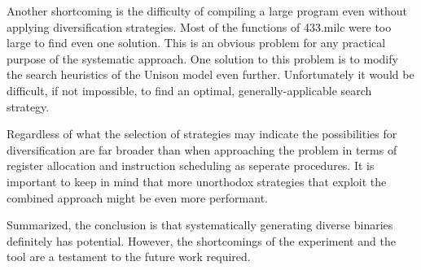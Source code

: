 Another shortcoming is the difficulty of compiling a large program even without applying
diversification strategies. Most of the functions of 433.milc were too large to find even
one solution. This is an obvious problem for any practical purpose of the systematic
approach. One solution to this problem is to modify the search heuristics of the Unison
model even further. Unfortunately it would be difficult, if not impossible, to find an
optimal, generally-applicable search strategy.

Regardless of what the selection of strategies may indicate the possibilities for
diversification are far broader than when approaching the problem in terms of register
allocation and instruction scheduling as seperate procedures. It is important to keep in
mind that more unorthodox strategies that exploit the combined approach might be even
more performant.

Summarized, the conclusion is that systematically generating diverse binaries definitely
has potential. However, the shortcomings of the experiment and the tool are a testament to
the future work required.
